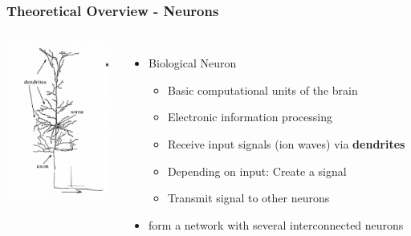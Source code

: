 \documentclass{beamer}
\begin{document}
\begin{frame}
    \frametitle{Theoretical Overview - Neurons}
    \begin{columns}
             \centering
             \includegraphics[height=5cm, width=3.5cm]{figures/neuron_script.png}
              \begin{itemize}

   				\item Biological Neuron
   				\begin{itemize}
   					\item Basic computational units of the brain
   					\item Electronic information processing
   					\item Receive input signals (ion waves) via \textbf{dendrites}
   					\item Depending on input: Create a signal
   					\item Transmit signal to other neurons
   				\end{itemize}

   				\item form a network with several interconnected neurons
 			\end{itemize}
	\end{columns}

\end{frame}
\end{document}
